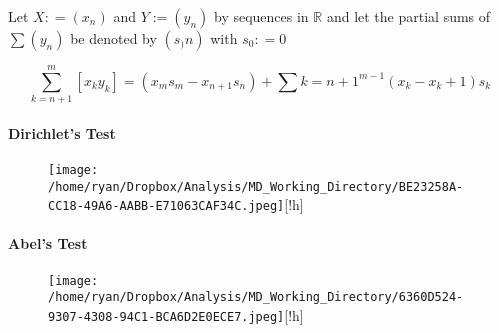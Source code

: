 \documentclass[
]{article}
\let\oldparagraph\paragraph
\renewcommand{\paragraph}[1]{\oldparagraph{#1}\mbox{}}
\begin{document}
Let \(X: = \left( x_n \right)\) and \(Y:= \left( y_n \right)\) by
sequences in \(\mathbb{R}\) and let the partial sums of
\(\sum\left( y_n \right)\) be denoted by \(\left( s_)n \right)\) with
\(s_0 : = 0\)

\[\sum_{k=n+1}^{m}\left[ x_ky_k \right]=\left( x_ms_m - x_{n+1}s_n \right) + \sum{k=n+1}^{m-1}\left( x_k-x_k+1 \right)s_k
  \label{partsum}\]



\hypertarget{header-n3311}{%
\paragraph{Dirichlet's Test}\label{header-n3311}}

\begin{figure}
\centering
\texttt{[image: /home/ryan/Dropbox/Analysis/MD\_Working\_Directory/BE23258A-CC18-49A6-AABB-E71063CAF34C.jpeg]}[!h]
\caption{}
\end{figure}

\hypertarget{header-n3314}{%
\paragraph{Abel's Test}\label{header-n3314}}

\begin{figure}
\centering
\texttt{[image: /home/ryan/Dropbox/Analysis/MD\_Working\_Directory/6360D524-9307-4308-94C1-BCA6D2E0ECE7.jpeg]}[!h]
\caption{}
\end{figure}
\end{document}
